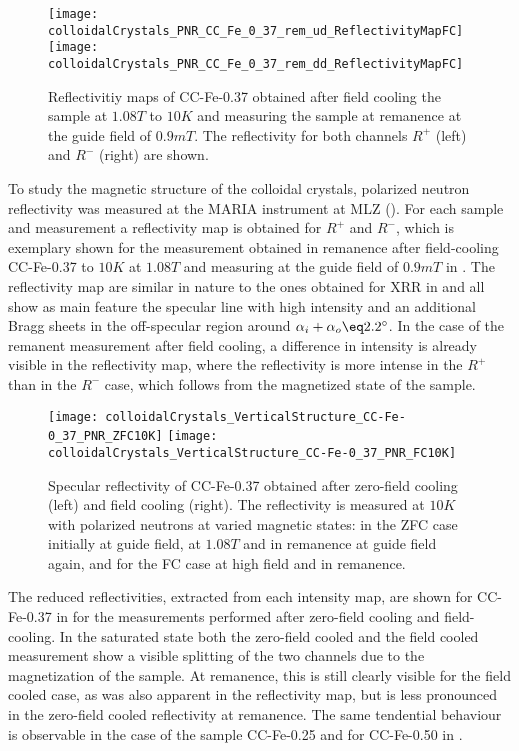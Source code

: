 \documentclass[\main/dresen_thesis.tex]{subfiles}
\begin{document}
  \label{sec:colloidalCrystals:layers:pnr}

  \begin{figure}[tb]
    \centering
    \texttt{[image: colloidalCrystals\_PNR\_CC\_Fe\_0\_37\_rem\_ud\_ReflectivityMapFC]}
    \texttt{[image: colloidalCrystals\_PNR\_CC\_Fe\_0\_37\_rem\_dd\_ReflectivityMapFC]}
    \caption{\label{fig:colloidalCrystals:pnrRemanenceMaps} Reflectivitiy maps of CC-Fe-0.37 obtained after field cooling the sample at $1.08 \unit{T}$ to $10 \unit{K}$ and measuring the sample at remanence at the guide field of $0.9 \unit{mT}$. The reflectivity for both channels $R^{+}$ (left) and $R^{-}$ (right) are shown.}
  \end{figure}

  To study the magnetic structure of the colloidal crystals, polarized neutron reflectivity was measured at the MARIA instrument at MLZ ().
  For each sample and measurement a reflectivity map is obtained for $R^{+}$ and $R^{-}$, which is exemplary shown for the measurement obtained in remanence after field-cooling CC-Fe-0.37 to $10 \unit{K}$ at $1.08\unit{T}$ and measuring at the guide field of $0.9 \unit{mT}$ in .
  The reflectivity map are similar in nature to the ones obtained for XRR in  and all show as main feature the specular line with high intensity and an additional Bragg sheets in the off-specular region around $\alpha_i + \alpha_o \eq 2.2^\circ$.
  In the case of the remanent measurement after field cooling, a difference in intensity is already visible in the reflectivity map, where the reflectivity is more intense in the $R^{+}$ than in the $R^{-}$ case, which follows from the magnetized state of the sample.

  \begin{figure}[tb]
    \centering
    \texttt{[image: colloidalCrystals\_VerticalStructure\_CC-Fe-0\_37\_PNR\_ZFC10K]}
    \texttt{[image: colloidalCrystals\_VerticalStructure\_CC-Fe-0\_37\_PNR\_FC10K]}
    \caption{\label{fig:colloidalCrystals:pnrCCFe37}Specular reflectivity of CC-Fe-0.37 obtained after zero-field cooling (left) and field cooling (right). The reflectivity is measured at $10 \unit{K}$ with polarized neutrons at varied magnetic states: in the ZFC case initially at guide field, at $1.08 \unit{T}$ and in remanence at guide field again, and for the FC case at high field and in remanence.}
  \end{figure}

  The reduced reflectivities, extracted from each intensity map, are shown for CC-Fe-0.37 in  for the measurements performed after zero-field cooling and field-cooling.
  In the saturated state both the zero-field cooled and the field cooled measurement show a visible splitting of the two channels due to the magnetization of the sample.
  At remanence, this is still clearly visible for the field cooled case, as was also apparent in the reflectivity map, but is less pronounced in the zero-field cooled reflectivity at remanence.
  The same tendential behaviour is observable in the case of the sample CC-Fe-0.25 and for CC-Fe-0.50 in .
\end{document}
